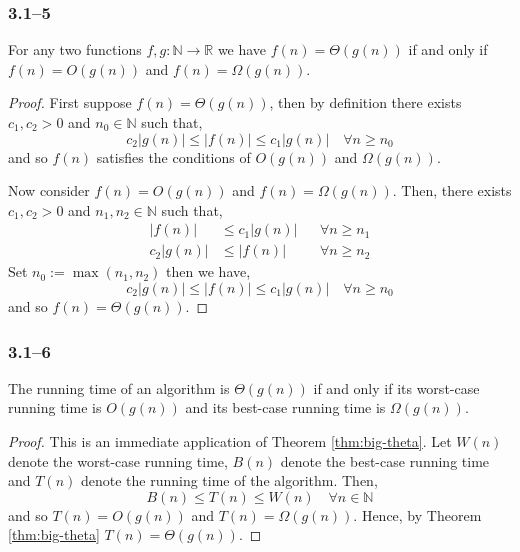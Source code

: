 \subsubsection*{3.1--5}

\begin{theorem}
	\label{thm:big-theta}
	For any two functions $f,g:\mathbb{N}\to\mathbb{R}$ we have $f(n)=\Theta(g(n))$ if and only if $f(n)=O(g(n))$ and $f(n)=\Omega(g(n))$.
\end{theorem}

\begin{proof}
	First suppose $f(n)=\Theta(g(n))$, then by definition there exists $c_{1},c_{2}>0$ and $n_{0}\in\mathbb{N}$ such that,
	\begin{equation*}
		c_{2}\left|g(n)\right| \leq \left|f(n)\right| \leq c_{1}\left|g(n)\right| \quad\forall n\geq n_{0}
	\end{equation*}
	and so $f(n)$ satisfies the conditions of $O(g(n))$ and $\Omega(g(n))$.

	Now consider $f(n)=O(g(n))$ and $f(n)=\Omega(g(n))$. Then, there exists $c_{1},c_{2}>0$ and $n_{1},n_{2}\in\mathbb{N}$ such that,
	\begin{equation*}
		\begin{aligned}
			\left|f(n)\right| &\leq c_{1}\left|g(n)\right|& &\forall n\geq n_{1}\\
			c_{2}\left|g(n)\right| &\leq \left|f(n)\right|& &\forall n\geq n_{2}
		\end{aligned}
	\end{equation*}
	Set $n_{0}:=\max(n_{1},n_{2})$ then we have,
	\begin{equation*}
		c_{2}\left|g(n)\right| \leq \left|f(n)\right| \leq c_{1}\left|g(n)\right|\quad\forall n\geq n_{0}
	\end{equation*}
	and so $f(n)=\Theta(g(n))$.
\end{proof}

\subsubsection*{3.1--6}

\begin{corollary}
	\label{cor:big-theta}
	The running time of an algorithm is $\Theta(g(n))$ if and only if its worst-case running time is $O(g(n))$ and its best-case running time is $\Omega(g(n))$.
\end{corollary}

\begin{proof}
	This is an immediate application of Theorem \ref{thm:big-theta}. Let $W(n)$ denote the worst-case running time, $B(n)$ denote the best-case running time and $T(n)$ denote the running time of the algorithm. Then,
	\begin{equation*}
		B(n) \leq T(n) \leq W(n)\quad\forall n\in\mathbb{N}
	\end{equation*}
	and so $T(n)=O(g(n))$ and $T(n)=\Omega(g(n))$. Hence, by Theorem \ref{thm:big-theta} $T(n)=\Theta(g(n))$.
\end{proof}


